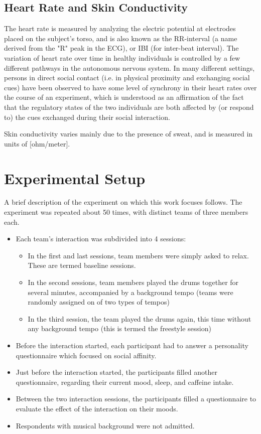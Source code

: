 \documentclass[a4paper, 11pt]{article}      %
\begin{document}
\subsection{Heart Rate and Skin Conductivity}
The heart rate is measured by analyzing the electric potential at electrodes placed on the subject's torso, and is also known as the RR-interval (a name derived from the "R" peak in the ECG), or IBI (for inter-beat interval). The variation of heart rate over time in healthy individuals is controlled by a few different pathways in the autonomous nervous system. In many different settings, persons in direct social contact (i.e. in physical proximity and exchanging social cues) have been observed to have some level of synchrony in their heart rates over the course of an experiment, which is understood as an affirmation of the fact that the regulatory states of the two individuals are both affected by (or respond to) the cues exchanged during their social interaction.

Skin conductivity varies mainly due to the presence of sweat, and is measured in units of [ohm\slash meter].

\section{Experimental Setup}
A brief description of the experiment on which this work focuses follows. The experiment was repeated about 50 times, with distinct teams of three members each.
\begin{itemize}
    \item Each team's interaction was subdivided into 4 sessions:
    \begin{itemize}
        \item In the first and last sessions, team members were simply asked to relax. These are termed baseline sessions.
        \item In the second sessions, team members played the drums together for several minutes, accompanied by a background tempo (teams were randomly assigned on of two types of tempos)
        \item In the third session, the team played the drums again, this time without any background tempo (this is termed the freestyle session) 
    \end{itemize}
    \item Before the interaction started, each participant had to answer a personality questionnaire which focused on social affinity.
    \item Just before the interaction started, the participants filled another questionnaire, regarding their current mood, sleep, and caffeine intake.
    \item Between the two interaction sessions, the participants filled a questionnaire to evaluate the effect of the interaction on their moods.
    \item Respondents with musical background were not admitted.
\end{itemize}
\end{document}
